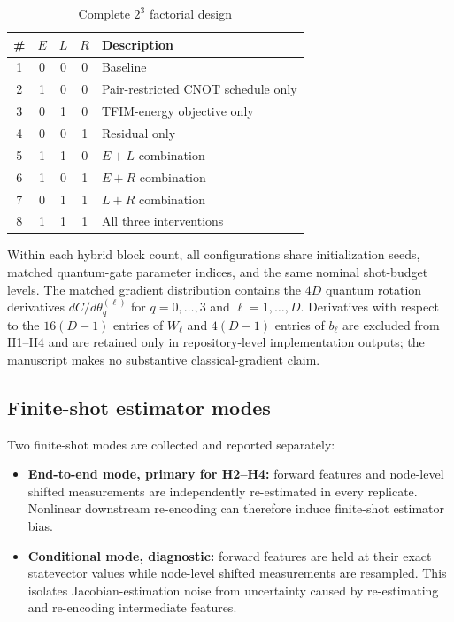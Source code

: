 \documentclass[pdflatex,sn-basic,Numbered]{sn-jnl}
\begin{document}
\begin{table}[t]
\centering
\begin{tabular}{cccc l}
\toprule
\# & $E$ & $L$ & $R$ & Description \\
\midrule
1 & 0 & 0 & 0 & Baseline \\
2 & 1 & 0 & 0 & Pair-restricted CNOT schedule only \\
3 & 0 & 1 & 0 & TFIM-energy objective only \\
4 & 0 & 0 & 1 & Residual only \\
5 & 1 & 1 & 0 & $E+L$ combination \\
6 & 1 & 0 & 1 & $E+R$ combination \\
7 & 0 & 1 & 1 & $L+R$ combination \\
8 & 1 & 1 & 1 & All three interventions \\
\bottomrule
\end{tabular}
\caption{Complete $2^3$ factorial design}
\label{tab:configurations}
\end{table}

Within each hybrid block count, all configurations share initialization seeds, matched quantum-gate parameter indices, and the same nominal shot-budget levels. The matched gradient distribution contains the $4D$ quantum rotation derivatives $dC/d\theta_q^{(\ell)}$ for $q=0,\ldots,3$ and $\ell=1,\ldots,D$. Derivatives with respect to the $16(D-1)$ entries of $W_\ell$ and $4(D-1)$ entries of $b_\ell$ are excluded from H1--H4 and are retained only in repository-level implementation outputs; the manuscript makes no substantive classical-gradient claim.

\subsection{Finite-shot estimator modes}

Two finite-shot modes are collected and reported separately:

\begin{itemize}
\item \textbf{End-to-end mode, primary for H2--H4:} forward features and node-level shifted measurements are independently re-estimated in every replicate. Nonlinear downstream re-encoding can therefore induce finite-shot estimator bias.
\item \textbf{Conditional mode, diagnostic:} forward features are held at their exact statevector values while node-level shifted measurements are resampled. This isolates Jacobian-estimation noise from uncertainty caused by re-estimating and re-encoding intermediate features.
\end{itemize}
\end{document}
